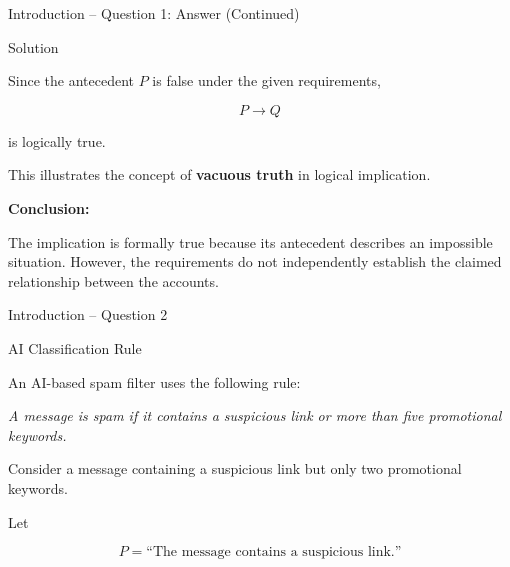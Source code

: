 \begin{frame}{Introduction -- Question 1: Answer (Continued)}

\begin{exampleblock}{Solution}

Since the antecedent $P$ is false under the given requirements,

\[
P\rightarrow Q
\]

is logically true.

This illustrates the concept of \textbf{vacuous truth} in logical
implication.

\medskip

\textbf{Conclusion:}

The implication is formally true because its antecedent describes an
impossible situation. However, the requirements do not independently
establish the claimed relationship between the accounts.

\end{exampleblock}

\end{frame}


\begin{frame}{Introduction -- Question 2}

\begin{block}{AI Classification Rule}

An AI-based spam filter uses the following rule:

\begin{center}
\textit{A message is spam if it contains a suspicious link or more than
five promotional keywords.}
\end{center}

Consider a message containing a suspicious link but only two promotional
keywords.

Let

\[
P=\text{``The message contains a suspicious link.''}
\]

\end{block}

\end{frame}


